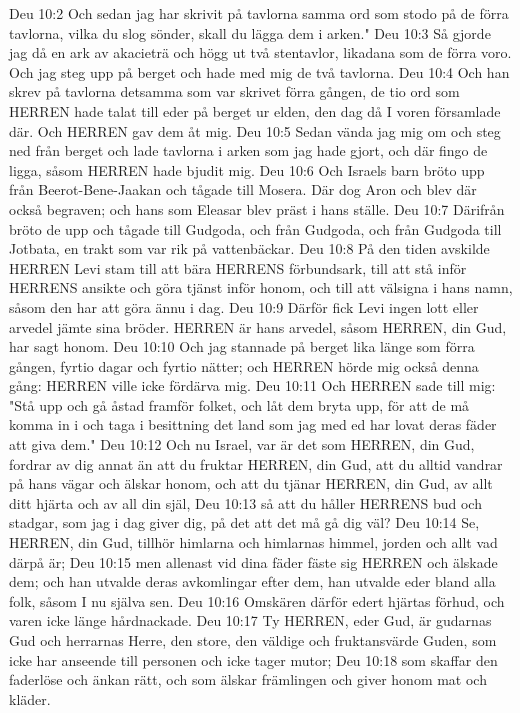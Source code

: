 Deu 10:2  Och sedan jag har skrivit på tavlorna samma ord som stodo på de förra tavlorna, vilka du slog sönder, skall du lägga dem i arken."
Deu 10:3  Så gjorde jag då en ark av akacieträ och högg ut två stentavlor, likadana som de förra voro. Och jag steg upp på berget och hade med mig de två tavlorna.
Deu 10:4  Och han skrev på tavlorna detsamma som var skrivet förra gången, de tio ord som HERREN hade talat till eder på berget ur elden, den dag då I voren församlade där. Och HERREN gav dem åt mig.
Deu 10:5  Sedan vända jag mig om och steg ned från berget och lade tavlorna i arken som jag hade gjort, och där fingo de ligga, såsom HERREN hade bjudit mig.
Deu 10:6  Och Israels barn bröto upp från Beerot-Bene-Jaakan och tågade till Mosera. Där dog Aron och blev där också begraven; och hans som Eleasar blev präst i hans ställe.
Deu 10:7  Därifrån bröto de upp och tågade till Gudgoda, och från Gudgoda, och från Gudgoda till Jotbata, en trakt som var rik på vattenbäckar.
Deu 10:8  På den tiden avskilde HERREN Levi stam till att bära HERRENS förbundsark, till att stå inför HERRENS ansikte och göra tjänst inför honom, och till att välsigna i hans namn, såsom den har att göra ännu i dag.
Deu 10:9  Därför fick Levi ingen lott eller arvedel jämte sina bröder. HERREN är hans arvedel, såsom HERREN, din Gud, har sagt honom.
Deu 10:10  Och jag stannade på berget lika länge som förra gången, fyrtio dagar och fyrtio nätter; och HERREN hörde mig också denna gång: HERREN ville icke fördärva mig.
Deu 10:11  Och HERREN sade till mig: "Stå upp och gå åstad framför folket, och låt dem bryta upp, för att de må komma in i och taga i besittning det land som jag med ed har lovat deras fäder att giva dem."
Deu 10:12  Och nu Israel, var är det som HERREN, din Gud, fordrar av dig annat än att du fruktar HERREN, din Gud, att du alltid vandrar på hans vägar och älskar honom, och att du tjänar HERREN, din Gud, av allt ditt hjärta och av all din själ,
Deu 10:13  så att du håller HERRENS bud och stadgar, som jag i dag giver dig, på det att det må gå dig väl?
Deu 10:14  Se, HERREN, din Gud, tillhör himlarna och himlarnas himmel, jorden och allt vad därpå är;
Deu 10:15  men allenast vid dina fäder fäste sig HERREN och älskade dem; och han utvalde deras avkomlingar efter dem, han utvalde eder bland alla folk, såsom I nu själva sen.
Deu 10:16  Omskären därför edert hjärtas förhud, och varen icke länge hårdnackade.
Deu 10:17  Ty HERREN, eder Gud, är gudarnas Gud och herrarnas Herre, den store, den väldige och fruktansvärde Guden, som icke har anseende till personen och icke tager mutor;
Deu 10:18  som skaffar den faderlöse och änkan rätt, och som älskar främlingen och giver honom mat och kläder.
